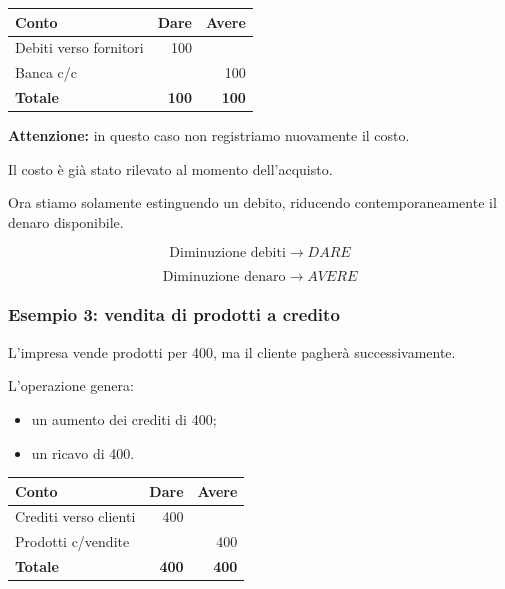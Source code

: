 \begin{center}
\begin{tabular}{|l|r|r|}
\hline
\textbf{Conto} & \textbf{Dare} & \textbf{Avere} \\
\hline
Debiti verso fornitori & 100 & \\
\hline
Banca c/c & & 100 \\
\hline
\textbf{Totale} & \textbf{100} & \textbf{100} \\
\hline
\end{tabular}
\end{center}

\noindent \textbf{Attenzione:} in questo caso
non registriamo nuovamente il costo.

\medskip

\noindent Il costo è già stato rilevato
al momento dell'acquisto.

\medskip

\noindent Ora stiamo solamente estinguendo un debito,
riducendo contemporaneamente il denaro disponibile.

\[
\boxed{
\text{Diminuzione debiti}
\rightarrow DARE
}
\]

\[
\boxed{
\text{Diminuzione denaro}
\rightarrow AVERE
}
\]


\subsubsection*{Esempio 3: vendita di prodotti a credito}

\noindent L'impresa vende prodotti per 400,
ma il cliente pagherà successivamente.

\medskip

\noindent L'operazione genera:

\begin{itemize}
    \item un aumento dei crediti di 400;
    \item un ricavo di 400.
\end{itemize}

\begin{center}
\begin{tabular}{|l|r|r|}
\hline
\textbf{Conto} & \textbf{Dare} & \textbf{Avere} \\
\hline
Crediti verso clienti & 400 & \\
\hline
Prodotti c/vendite & & 400 \\
\hline
\textbf{Totale} & \textbf{400} & \textbf{400} \\
\hline
\end{tabular}
\end{center}

